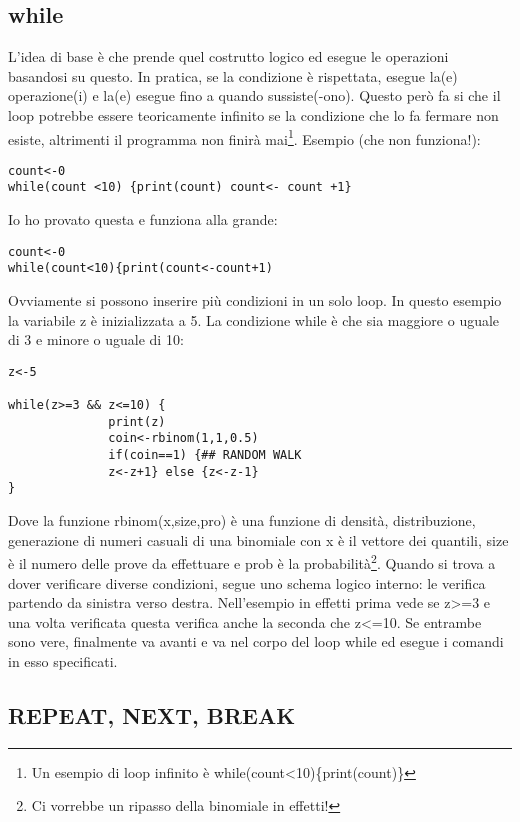 \subsection{while}

L'idea di base è che \erre prende quel costrutto logico ed esegue le operazioni basandosi su questo.
In pratica, se la condizione è rispettata, \erre esegue la(e) operazione(i) e la(e) esegue fino a quando sussiste(-ono). Questo però
fa si che il loop potrebbe essere teoricamente infinito se la condizione che lo fa fermare
non esiste, altrimenti il programma non finirà mai\footnote{Un esempio di loop infinito è while(count<10)\{print(count)\} }.
Esempio (che non funziona!):

\begin{lstlisting}
count<-0
while(count <10) {print(count) count<- count +1}
\end{lstlisting}
Io ho provato questa e funziona alla grande:
\begin{lstlisting}
count<-0
while(count<10){print(count<-count+1)
\end{lstlisting}

Ovviamente si possono inserire più condizioni in un solo loop.
In questo esempio la variabile z è inizializzata a 5. La condizione while è che sia maggiore o uguale di 3 e minore o uguale di 10:
\begin{lstlisting}
z<-5

while(z>=3 && z<=10) {
		      print(z)
		      coin<-rbinom(1,1,0.5)
		      if(coin==1) {## RANDOM WALK
		      z<-z+1} else {z<-z-1}
}
\end{lstlisting}

Dove la funzione rbinom(x,size,pro) è una funzione di densità, distribuzione,
generazione di numeri casuali di una binomiale con x è il vettore dei quantili,
size è il numero delle prove da effettuare e prob è la probabilità\footnote{Ci vorrebbe
un ripasso della binomiale in effetti!}.
Quando \erre si trova a dover verificare diverse condizioni, segue uno schema
logico interno: le verifica partendo da sinistra verso destra.
Nell'esempio in effetti prima vede se z>=3 e una volta verificata questa 
verifica anche la seconda che z<=10.
Se entrambe sono vere, finalmente \erre va avanti e va nel corpo del loop while
ed esegue i comandi in esso specificati.


\subsection{REPEAT, NEXT, BREAK}

